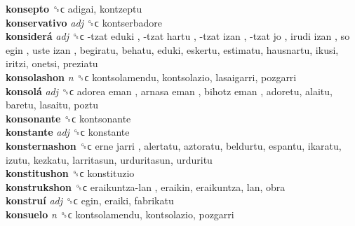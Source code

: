 \textbf{konsepto} ␝ϲ  adigai, kontzeptu  \\
\textbf{konservativo} \emph{adj}  ␝ϲ  kontserbadore  \\
\textbf{konsiderá} \emph{adj}  ␝ϲ   -tzat eduki ,  -tzat hartu ,  -tzat izan ,  -tzat jo ,  irudi izan ,  so egin ,  uste izan , begiratu, behatu, eduki, eskertu, estimatu, hausnartu, ikusi, iritzi, onetsi, preziatu  \\
\textbf{konsolashon} \emph{n}  ␝ϲ  kontsolamendu, kontsolazio, lasaigarri, pozgarri  \\
\textbf{konsolá} \emph{adj}  ␝ϲ   adorea eman ,  arnasa eman ,  bihotz eman , adoretu, alaitu, baretu, lasaitu, poztu  \\
\textbf{konsonante} ␝ϲ  kontsonante  \\
\textbf{konstante} \emph{adj}  ␝ϲ  konstante  \\
\textbf{konsternashon} ␝ϲ   erne jarri , alertatu, aztoratu, beldurtu, espantu, ikaratu, izutu, kezkatu, larritasun, urduritasun, urduritu  \\
\textbf{konstitushon} ␝ϲ  konstituzio  \\
\textbf{konstrukshon} ␝ϲ   eraikuntza-lan , eraikin, eraikuntza, lan, obra  \\
\textbf{konstruí} \emph{adj}  ␝ϲ  egin, eraiki, fabrikatu  \\
\textbf{konsuelo} \emph{n}  ␝ϲ  kontsolamendu, kontsolazio, pozgarri  \\
